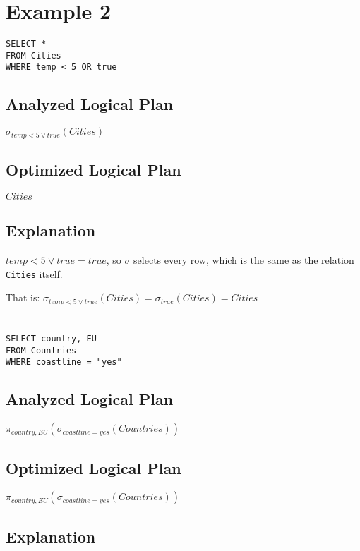 \documentclass[12pt]{article}
\begin{document}
\newpage

\section*{Example 2}
\begin{verbatim}
SELECT *
FROM Cities
WHERE temp < 5 OR true
\end{verbatim}

\subsection*{Analyzed Logical Plan}
$\sigma_{temp < 5 \vee true}(Cities)$

\subsection*{Optimized Logical Plan}
$Cities$

\subsection*{Explanation}
$temp < 5 \vee true = true$, so $\sigma$ selects every row,
which is the same as the relation \verb|Cities| itself.

That is:
$\sigma_{temp < 5 \vee true}(Cities) = \sigma_{true}(Cities) = Cities$

\newpage

\section{}
\begin{verbatim}
SELECT country, EU
FROM Countries
WHERE coastline = "yes"
\end{verbatim}

\subsection*{Analyzed Logical Plan}
$\pi_{country, EU}(\sigma_{coastline=yes}(Countries))$

\subsection*{Optimized Logical Plan}
$\pi_{country, EU}(\sigma_{coastline=yes}(Countries))$

\subsection*{Explanation}
\end{document}
